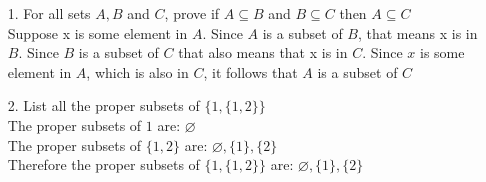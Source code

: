 \documentclass[a4paper,12pt]{article}
\begin{document}
    \begin{itemize}
      \item[1.] For all sets $A,B$ and $C$, prove if $A \subseteq B$ and $B \subseteq C$ then $A \subseteq C$
      \\
      Suppose x is some element in $A$. Since $A$ is a subset of $B$, that means x is in $B$. Since $B$ is a subset of $C$ that also means that x is in $C$. Since $x$ is some element in $A$, which is also in $C$, it follows that $A$ is a subset of $C$
      \item[2.] List all the proper subsets of $\{1, \{1,2\}\}$     
      \\
      The proper subsets of $1$ are: $\varnothing$
      \\
      The proper subsets of $\{1,2\}$ are: $\varnothing, \{1\}, \{2\} $
      \\
      Therefore the proper subsets of $\{1, \{1,2\}\}$ are: $\varnothing, \{1\}, \{2\}$



    \end{itemize} 
\end{document}
